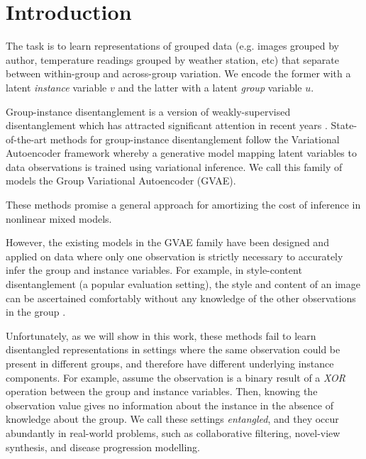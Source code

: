 \documentclass[nohyperref]{article}
\theoremstyle{plain}
\theoremstyle{definition}
\theoremstyle{remark}
\begin{document}
\section{Introduction}
\label{intro}

The task is to learn representations of grouped data (e.g. images grouped by author, temperature readings grouped by weather station, etc) that separate between within-group and across-group variation. We encode the former with a latent \textit{instance} variable $v$ and the latter with a latent \textit{group} variable $u$. 

Group-instance disentanglement is a version of weakly-supervised disentanglement which has attracted significant attention in recent years \citep{Tschannen2018RecentAI}. State-of-the-art methods for group-instance disentanglement \citep{Bouchacourt2018MultiLevelVA,Hosoya2019GroupbasedLO,Shu2020Weakly, Chen2020WeaklySD,Locatello2020WeaklySupervisedDW} follow the Variational Autoencoder framework \citep{Kingma2014AutoEncodingVB,JimenezRezende2014StochasticBA} whereby a generative model mapping latent variables to data observations is trained using variational inference. We call this family of models the Group Variational Autoencoder (GVAE).

These methods promise a general approach for amortizing the cost of inference in nonlinear mixed models. 

However, the existing models in the GVAE family have been designed and applied on data where only one observation is strictly necessary to accurately infer the group and instance variables. For example, in style-content disentanglement (a popular evaluation setting), the style and content of an image can be ascertained comfortably without any knowledge of the other observations in the group \citep{Zhu2017UnpairedIT,Kotovenko2019ContentAS}.

Unfortunately, as we will show in this work, these methods fail to learn disentangled representations in settings where the same observation could be present in different groups, and therefore have different underlying instance components. For example, assume the observation is a binary result of a \textit{XOR} operation between the group and instance variables. Then, knowing the observation value gives no information about the instance in the absence of knowledge about the group. We call these settings \textit{entangled}, and they occur abundantly in real-world problems, such as collaborative filtering, novel-view synthesis, and disease progression modelling.
\end{document}
